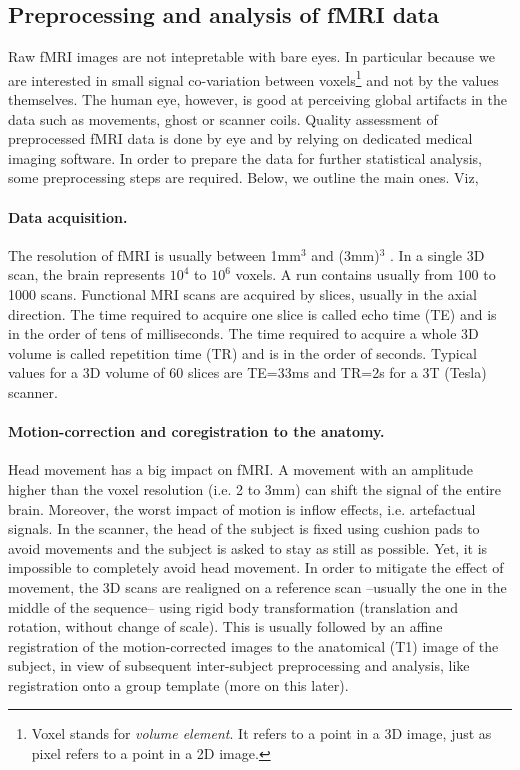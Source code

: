 \subsection{Preprocessing and analysis of fMRI data}
Raw fMRI images are not intepretable with bare eyes. In particular because
we are interested in small signal co-variation between voxels\footnote{Voxel stands for \textit{volume element}. It refers
to a point in a 3D image, just as pixel refers to a point in a 2D image.}  and not by the
values themselves. The human eye, however, is good at perceiving global artifacts
in the data such as movements, ghost or scanner coils. Quality assessment of
preprocessed fMRI data is done by eye and by relying on dedicated medical
imaging software. In order to prepare the data for further statistical analysis,
some preprocessing steps are required. Below, we outline the main ones. Viz,

\paragraph{Data acquisition.}
The resolution of fMRI is usually between 1mm$^3$ and
(3mm)$^3$ . In a single 3D scan, the brain represents $10^4$ to $10^6$ voxels.
A run contains usually from 100 to 1000 scans. Functional MRI scans are
acquired by slices, usually in the axial direction. The time required to acquire
one slice is called echo time (TE) and is in the order of tens of milliseconds.
The time required to acquire a whole 3D volume is called repetition time (TR)
and is in the order of seconds. Typical values for a 3D volume of 60 slices are
TE=33ms and TR=2s for a 3T (Tesla) scanner.

\paragraph{Motion-correction and coregistration to the anatomy.}
Head movement has a big impact on fMRI. A movement
with an amplitude higher than the voxel resolution (i.e. 2 to 3mm) can
shift the signal of the entire brain. Moreover, the worst impact of motion is
inflow effects, i.e. artefactual signals. In the scanner, the head of the subject is
fixed using cushion pads to avoid movements and the subject is asked to stay
as still as possible. Yet, it is impossible to completely avoid head movement.
In order to mitigate the effect of movement, the 3D scans are realigned on a
reference scan --usually the one in the middle of the sequence-- using rigid
body transformation (translation and rotation, without change of scale).
This is usually followed by an affine registration of the motion-corrected images to
the anatomical (T1) image of the subject, in view of subsequent inter-subject preprocessing and analysis, like registration onto a group template (more on this later).

